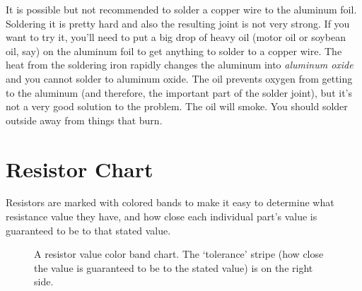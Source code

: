 It is possible but not recommended to solder a copper wire to the aluminum foil. Soldering it is pretty hard and also the resulting joint is not very strong. If you want to try it, you'll need to put a big drop of heavy oil (motor oil or soybean oil, say) on the aluminum foil to get anything to solder to a copper wire. The heat from the soldering iron rapidly changes the aluminum into \emph{aluminum oxide} and you cannot solder to aluminum oxide. The oil prevents oxygen from getting to the aluminum (and therefore, the important part of the solder joint), but it's not a very good solution to the problem. The oil will smoke. You should solder outside away from things that burn.

\newpage
\section*{Resistor Chart}

Resistors are marked with colored bands to make it easy to determine what resistance value they have, and how close each individual part's value is guaranteed to be to that stated value.


\begin{figure}[!ht]
\begin{center}
\end{center}
\caption{A resistor value color band chart. The `tolerance' stripe (how close the value is guaranteed to be to the stated value) is on the right side. }
\label{fig:resistorchart}
\end{figure}
